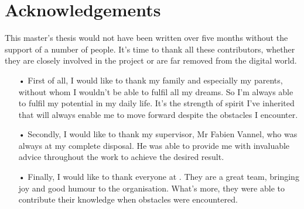 
\chapter*{Acknowledgements}


This master's thesis would not have been written over five months without the support of a number of people. It's time to thank all these contributors, whether they are closely involved in the project or are far removed from the digital world.

\begin{itemize}
    \item [•] First of all, I would like to thank my family and especially my parents, without whom I wouldn't be able to fulfil all my dreams. So I'm always able to fulfil my potential in my daily life. It's the strength of spirit I've inherited that will always enable me to move forward despite the obstacles I encounter.
    \item [•] Secondly, I would like to thank my supervisor, Mr Fabien Vannel, who was always at my complete disposal. He was able to provide me with invaluable advice throughout the work to achieve the desired result.
    \item [•] Finally, I would like to thank everyone at . They are a great team, bringing joy and good humour to the organisation. What's more, they were able to contribute their knowledge when obstacles were encountered.
\end{itemize}